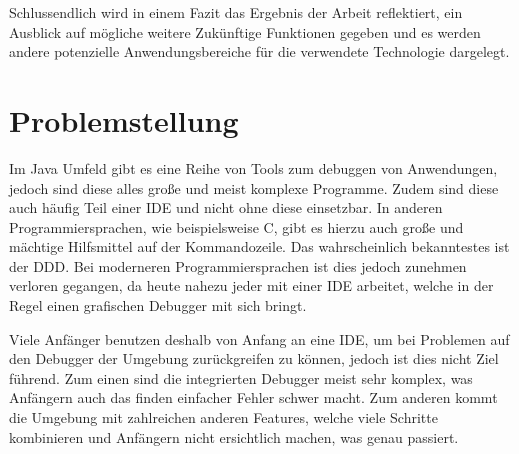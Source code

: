 Schlussendlich wird in einem Fazit das Ergebnis der Arbeit reflektiert, ein Ausblick auf mögliche weitere Zukünftige Funktionen gegeben und es werden andere potenzielle Anwendungsbereiche für die verwendete Technologie dargelegt.

\section{Problemstellung} 

Im Java Umfeld gibt es eine Reihe von Tools zum debuggen von Anwendungen, jedoch sind diese alles große und meist komplexe Programme. Zudem sind diese auch häufig Teil einer \ac{IDE} und nicht ohne diese einsetzbar.
In anderen Programmiersprachen, wie beispielsweise C, gibt es hierzu auch große und mächtige Hilfsmittel auf der Kommandozeile. Das wahrscheinlich bekanntestes ist der \ac{DDD}. Bei moderneren Programmiersprachen ist dies jedoch zunehmen verloren gegangen, da heute nahezu jeder mit einer \ac{IDE} arbeitet, welche in der Regel einen grafischen Debugger mit sich bringt.

Viele Anfänger benutzen deshalb von Anfang an eine \ac{IDE}, um bei Problemen auf den Debugger der Umgebung zurückgreifen zu können, jedoch ist dies nicht Ziel führend. Zum einen sind die integrierten Debugger meist sehr komplex, was Anfängern auch das finden einfacher Fehler schwer macht. Zum anderen kommt die Umgebung mit zahlreichen anderen Features, welche viele Schritte kombinieren und Anfängern nicht ersichtlich machen, was genau passiert.